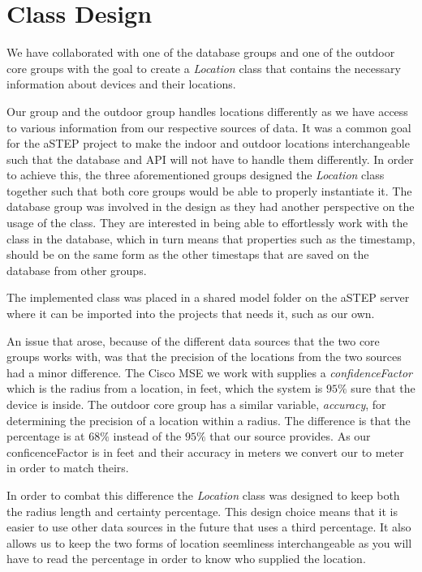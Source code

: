 \section{Class Design}
We have collaborated with one of the database groups and one of the outdoor core groups with the goal to create a \textit{Location} class that contains the necessary information about devices and their locations. 

Our group and the outdoor group handles locations differently as we have access to various information from our respective sources of data. It was a common goal for the aSTEP project to make the indoor and outdoor locations interchangeable such that the database and API will not have to handle them differently. In order to achieve this, the three aforementioned groups designed the \textit{Location} class together such that both core groups would be able to properly instantiate it. The database group was involved in the design as they had another perspective on the usage of the class. They are interested in being able to effortlessly work with the class in the database, which in turn means that properties such as the timestamp, should be on the same form as the other timestaps that are saved on the database from other groups. 

The implemented class was placed in a shared model folder on the aSTEP server %
where it can be imported into the projects that needs it, such as our own. 

An issue that arose, because of the different data sources that the two core groups works with, was that the precision of the locations from the two sources had a minor difference. The Cisco MSE we work with supplies a \textit{confidenceFactor} which is the radius from a location, in feet, which the system is $95\%$ sure that the device is inside\cite{MSE_faq}. The outdoor core group has a similar variable, \textit{accuracy}, for determining the precision of a location within a radius. The difference is that the percentage is at $68\%$ instead of the $95\%$ that our source provides\cite{android_getAccuracy}. As our conficenceFactor is in feet and their accuracy in meters we convert our to meter in order to match theirs. 

In order to combat this difference the \textit{Location} class was designed to keep both the radius length and certainty percentage. This design choice means that it is easier to use other data sources in the future that uses a third percentage. It also allows us to keep the two forms of location seemliness interchangeable as you will have to read the percentage in order to know who supplied the location.